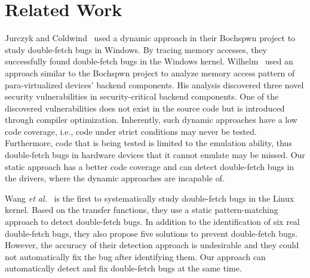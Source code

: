 \documentclass[10pt]{llncs}
\begin{document}
\section{Related Work}
\label{related}



Jurczyk and Coldwind~\cite{bochspwn,jurczyk2013identifying} used a dynamic approach in their Bochspwn project to study double-fetch bugs in Windows. By tracing memory accesses, they successfully found double-fetch bugs in the Windows kernel. Wilhelm~\cite{wilhelm15tracing} used an approach similar to the
Bochspwn project to analyze memory access pattern of para-virtualized
devices' backend components. His analysis discovered three novel security
vulnerabilities in security-critical backend components. One of the
discovered vulnerabilities does not exist in the source code but is
introduced through compiler optimization.
Inherently, such dynamic approaches have a low code coverage, i.e., code under strict conditions may never be tested. Furthermore, code that is being tested is limited to the emulation ability, thus double-fetch bugs in hardware devices that it cannot emulate may be missed. Our static approach has a better code coverage and can detect double-fetch bugs in the drivers, where the dynamic approaches are incapable of.


Wang \textit{et al.}~\cite{wang} is the first to systematically study double-fetch bugs in the Linux kernel. Based on the transfer functions, they use a static pattern-matching approach to detect double-fetch bugs. In addition to the identification of six real double-fetch bugs, they also propose five solutions to prevent double-fetch bugs. However, the accuracy of their detection approach is undesirable and they could not automatically fix the bug after identifying them. %
Our approach can automatically detect and fix double-fetch bugs at the same time.
\end{document}

